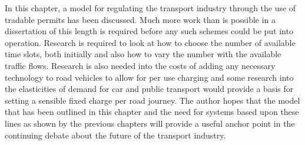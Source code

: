 In this chapter, a model for regulating the transport industry through the use of tradable permits has been discussed. Much more work than is possible in a dissertation of this length is required before any such schemes could be put into operation. Research is required to look at how to choose the number of available time slots, both initially and also how to vary the number with the available traffic flows. Research is also needed into the costs of adding any necessary technology to road vehicles to allow for per use charging and some research into the elasticities of demand for car and public transport would provide a basis for setting a sensible fixed charge per road journey. The author hopes that the model that has been outlined in this chapter and the need for systems based upon these lines as shown by the previous chapters will provide a useful anchor point in the continuing debate about the future of the transport industry.